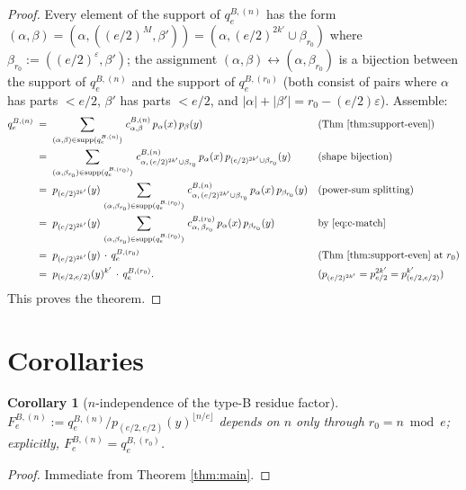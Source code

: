 \documentclass[11pt]{article}
\newtheorem{corollary}[theorem]{Corollary}
\theoremstyle{definition}
\theoremstyle{remark}
\newcommand{\eps}{\varepsilon}
\begin{document}
\begin{proof}
Every element of the support of $q_e^{B, (n)}$ has the form $(\alpha, \beta) = (\alpha, ((e/2)^{M}, \beta')) = (\alpha, (e/2)^{2k'} \cup \beta_{r_0})$ where $\beta_{r_0} := ((e/2)^{\eps}, \beta')$; the assignment $(\alpha, \beta) \leftrightarrow (\alpha, \beta_{r_0})$ is a bijection between the support of $q_e^{B, (n)}$ and the support of $q_e^{B, (r_0)}$ (both consist of pairs where $\alpha$ has parts $< e/2$, $\beta'$ has parts $< e/2$, and $|\alpha| + |\beta'| = r_0 - (e/2)\eps$). Assemble:
\begin{align*}
  q_e^{B, (n)}
  &\;=\; \sum_{(\alpha, \beta) \in \text{supp}(q_e^{B, (n)})}\, c^{B, (n)}_{\alpha,\beta}\, p_\alpha(x)\, p_\beta(y) & &\text{(Thm \ref{thm:support-even})}\\
  &\;=\; \sum_{(\alpha, \beta_{r_0}) \in \text{supp}(q_e^{B, (r_0)})}\, c^{B, (n)}_{\alpha,\, (e/2)^{2k'} \cup \beta_{r_0}}\, p_\alpha(x)\, p_{(e/2)^{2k'} \cup \beta_{r_0}}(y) & &\text{(shape bijection)}\\
  &\;=\; p_{(e/2)^{2k'}}(y)\, \sum_{(\alpha, \beta_{r_0}) \in \text{supp}(q_e^{B, (r_0)})}\, c^{B, (n)}_{\alpha,\, (e/2)^{2k'} \cup \beta_{r_0}}\, p_\alpha(x)\, p_{\beta_{r_0}}(y) & &\text{(power-sum splitting)}\\
  &\;=\; p_{(e/2)^{2k'}}(y)\, \sum_{(\alpha, \beta_{r_0}) \in \text{supp}(q_e^{B, (r_0)})}\, c^{B, (r_0)}_{\alpha,\, \beta_{r_0}}\, p_\alpha(x)\, p_{\beta_{r_0}}(y) & &\text{by \eqref{eq:c-match}}\\
  &\;=\; p_{(e/2)^{2k'}}(y)\, \cdot\, q_e^{B, (r_0)} & &\text{(Thm \ref{thm:support-even} at $r_0$)}\\
  &\;=\; p_{(e/2, e/2)}(y)^{k'}\, \cdot\, q_e^{B, (r_0)}. & &\text{($p_{(e/2)^{2k'}} = p_{e/2}^{2k'} = p_{(e/2, e/2)}^{k'}$)}
\end{align*}
This proves the theorem.
\end{proof}

\section{Corollaries}

\begin{corollary}[$n$-independence of the type-B residue factor]\label{cor:n-indep}
$F_e^{B, (n)} := q_e^{B, (n)}/p_{(e/2, e/2)}(y)^{\lfloor n/e\rfloor}$ depends on $n$ only through $r_0 = n \bmod e$; explicitly,
$F_e^{B, (n)} = q_e^{B, (r_0)}$.
\end{corollary}

\begin{proof}
Immediate from Theorem \ref{thm:main}.
\end{proof}
\end{document}
